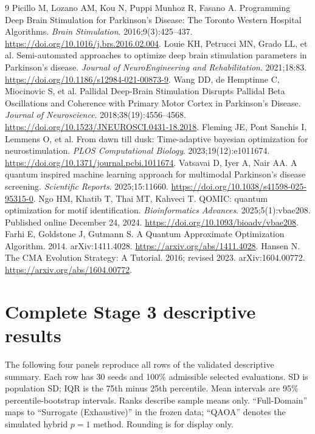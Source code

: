 \documentclass[11pt,letterpaper]{article}
\begin{document}
\begin{thebibliography}{9}
 Picillo M, Lozano AM, Kou N, Puppi Munhoz R, Fasano A. Programming Deep Brain Stimulation for Parkinson's Disease: The Toronto Western Hospital Algorithms. \emph{Brain Stimulation}. 2016;9(3):425--437. \url{https://doi.org/10.1016/j.brs.2016.02.004}.
 Louie KH, Petrucci MN, Grado LL, et al. Semi-automated approaches to optimize deep brain stimulation parameters in Parkinson's disease. \emph{Journal of NeuroEngineering and Rehabilitation}. 2021;18:83. \url{https://doi.org/10.1186/s12984-021-00873-9}.
 Wang DD, de Hemptinne C, Miocinovic S, et al. Pallidal Deep-Brain Stimulation Disrupts Pallidal Beta Oscillations and Coherence with Primary Motor Cortex in Parkinson's Disease. \emph{Journal of Neuroscience}. 2018;38(19):4556--4568. \url{https://doi.org/10.1523/JNEUROSCI.0431-18.2018}.
 Fleming JE, Pont Sanchis I, Lemmens O, et al. From dawn till dusk: Time-adaptive bayesian optimization for neurostimulation. \emph{PLOS Computational Biology}. 2023;19(12):e1011674. \url{https://doi.org/10.1371/journal.pcbi.1011674}.
 Vatsavai D, Iyer A, Nair AA. A quantum inspired machine learning approach for multimodal Parkinson's disease screening. \emph{Scientific Reports}. 2025;15:11660. \url{https://doi.org/10.1038/s41598-025-95315-0}.
 Ngo HM, Khatib T, Thai MT, Kahveci T. QOMIC: quantum optimization for motif identification. \emph{Bioinformatics Advances}. 2025;5(1):vbae208. Published online December 24, 2024. \url{https://doi.org/10.1093/bioadv/vbae208}.
 Farhi E, Goldstone J, Gutmann S. A Quantum Approximate Optimization Algorithm. 2014. arXiv:1411.4028. \url{https://arxiv.org/abs/1411.4028}.
 Hansen N. The CMA Evolution Strategy: A Tutorial. 2016; revised 2023. arXiv:1604.00772. \url{https://arxiv.org/abs/1604.00772}.
\end{thebibliography}

\clearpage\appendix
\renewcommand{\thefigure}{S\arabic{figure}}\setcounter{figure}{0}
\renewcommand{\thetable}{S\arabic{table}}\setcounter{table}{0}
\section{Complete Stage 3 descriptive results}\label{app:descriptive}
The following four panels reproduce all rows of the validated descriptive summary. Each row has 30 seeds and 100\% admissible selected evaluations. SD is population SD; IQR is the 75th minus 25th percentile. Mean intervals are 95\% percentile-bootstrap intervals. Ranks describe sample means only. ``Full-Domain'' maps to ``Surrogate (Exhaustive)'' in the frozen data; ``QAOA'' denotes the simulated hybrid $p=1$ method. Rounding is for display only.

\end{document}
